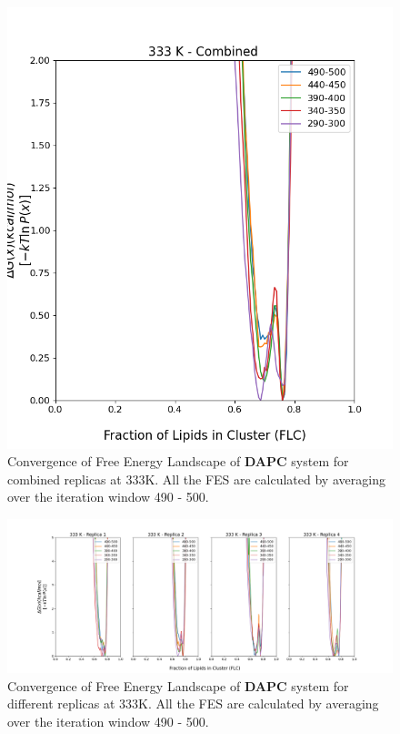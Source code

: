 \documentclass{biophys-new}
\begin{document}
\begin{figure}[hbt!]
\centering
\includegraphics[width=0.6\linewidth]{all_plots/ClusterLipids2Total/DPPC_DAPC_CHOL/333K/Convergence_DAPC_MULTI__333_ClusterLipids2Total.png}
\caption{Convergence of Free Energy Landscape of \textbf{DAPC} system for combined replicas at 333K. All the FES are calculated by averaging over the iteration window 490 - 500.}
\label{fig:view}

\end{figure}

\begin{figure}[hbt!]
\centering
\includegraphics[width=1.1\linewidth]{all_plots/ClusterLipids2Total/DPPC_DAPC_CHOL/333K/Convergence_DAPC_333_ClusterLipids2Total.png}
\caption{Convergence of Free Energy Landscape of \textbf{DAPC} system for different replicas at 333K. All the FES are calculated by averaging over the iteration window 490 - 500.}
\label{fig:view}

\end{figure}
\end{document}
